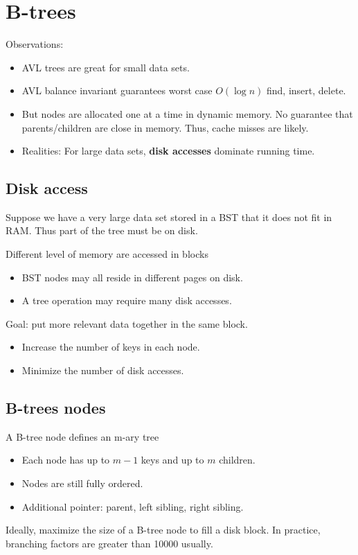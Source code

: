 \documentclass[letterpaper,12pt]{article}
\begin{document}
\section{B-trees}
Observations: \begin{itemize}
    \item AVL trees are great for small data sets.
    \item AVL balance invariant guarantees worst case $O(\log n)$ find, insert, delete.
    \item But nodes are allocated one at a time in dynamic memory. No guarantee that parents/children are close in memory. Thus, cache misses are likely.
    \item Realities: For large data sets, \textbf{disk accesses} dominate running time.
\end{itemize}
\subsection{Disk access}
Suppose we have a very large data set stored in a BST that it does not fit in RAM. Thus part of the tree must be on disk. 

Different level of memory are accessed in blocks\begin{itemize}
    \item BST nodes may all reside in different pages on disk.
    \item A tree operation may require many disk accesses.
\end{itemize}

Goal: put more relevant data together in the same block.\begin{itemize}
    \item Increase the number of keys in each node.
    \item Minimize the number of disk accesses.
\end{itemize}
\subsection{B-trees nodes}
A B-tree node defines an m-ary tree \begin{itemize}
    \item Each node has up to $m-1$ keys and up to $m$ children.
    \item Nodes are still fully ordered.
    \item Additional pointer: parent, left sibling, right sibling.
\end{itemize}
Ideally, maximize the size of a B-tree node to fill a disk block. In practice, branching factors are greater than 10000 usually. 
\end{document}
